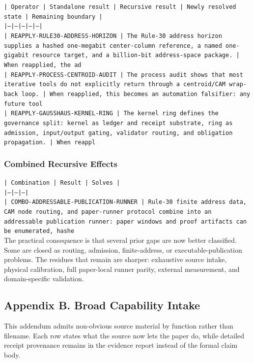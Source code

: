 \documentclass[11pt]{article}
\begin{document}
\noindent\texttt{| Operator | Standalone result | Recursive result | Newly resolved state | Remaining boundary |}\\
\noindent\texttt{|---|---|---|---|---|}\\
\noindent\texttt{| REAPPLY-RULE30-ADDRESS-HORIZON | The Rule-30 address horizon supplies a hashed one-megabit center-column reference, a named one-gigabit resource target, and a billion-bit address-space package. | When reapplied, the ad}\\
\noindent\texttt{| REAPPLY-PROCESS-CENTROID-AUDIT | The process audit shows that most iterative tools do not explicitly return through a centroid/CAM wrap-back loop. | When reapplied, this becomes an automation falsifier: any future tool}\\
\noindent\texttt{| REAPPLY-GAUSSHAUS-KERNEL-RING | The kernel ring defines the governance split: kernel as ledger and receipt substrate, ring as admission, input/output gating, validator routing, and obligation propagation. | When reappl}\\

\subsubsection*{Combined Recursive Effects}

\noindent\texttt{| Combination | Result | Solves |}\\
\noindent\texttt{|---|---|---|}\\
\noindent\texttt{| COMBO-ADDRESSABLE-PUBLICATION-RUNNER | Rule-30 finite address data, CAM node routing, and paper-runner protocol combine into an addressable publication runner: paper windows and proof artifacts can be enumerated, hashe}\\

The practical consequence is that several prior gaps are now better classified. Some are closed as routing, admission, finite-address, or executable-publication problems. The residues that remain are sharper: exhaustive source intake, physical calibration, full paper-local runner parity, external measurement, and domain-specific validation.

\subsection*{Appendix B. Broad Capability Intake}

This addendum admits non-obvious source material by function rather than filename. Each row states what the source now lets the paper do, while detailed receipt provenance remains in the evidence report instead of the formal claim body.
\end{document}
